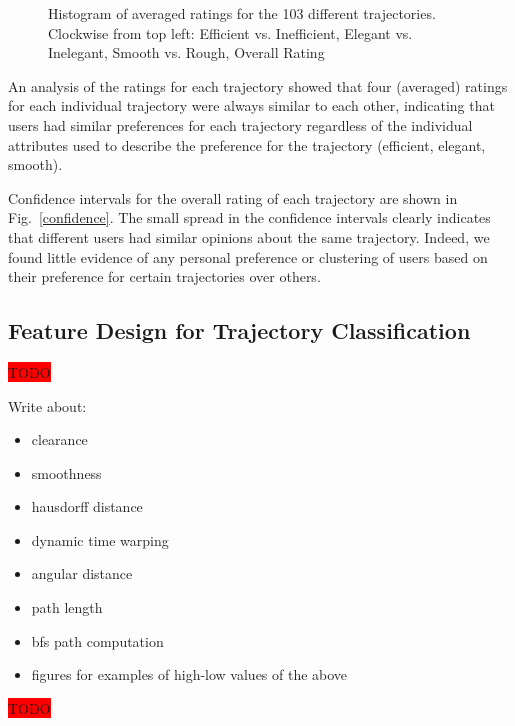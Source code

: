 \documentclass[letterpaper, 10 pt, conference]{ieeeconf}  %
\newcommand{\todo}{\colorbox{red}{TODO}}
\begin{document}
\begin{figure}[t]
  \caption{Histogram of averaged ratings for the 103 different trajectories. Clockwise from top left: Efficient vs. Inefficient, Elegant vs. Inelegant, Smooth vs. Rough, Overall Rating}
\label{fig:survey_raw}
\end{figure}


An analysis of the ratings for each trajectory showed that four (averaged) ratings for each individual trajectory were always similar to each other, indicating that users had similar preferences for each trajectory regardless of the individual attributes used to describe the preference for the trajectory (efficient, elegant, smooth). 

Confidence intervals for the overall rating of each trajectory are shown in Fig.~\ref{confidence}. The small spread in the confidence intervals clearly indicates that different users had similar opinions about the same trajectory. Indeed, we found little evidence of any personal preference or clustering of users based on their preference for certain trajectories over others. 

\subsection{Feature Design for Trajectory Classification}

\todo 

Write about:
\begin{itemize}
\item clearance
\item smoothness
\item hausdorff distance
\item dynamic time warping
\item angular distance
\item path length
\item bfs path computation
\item figures for examples of high-low values of the above
\end{itemize}
\todo
\end{document}

